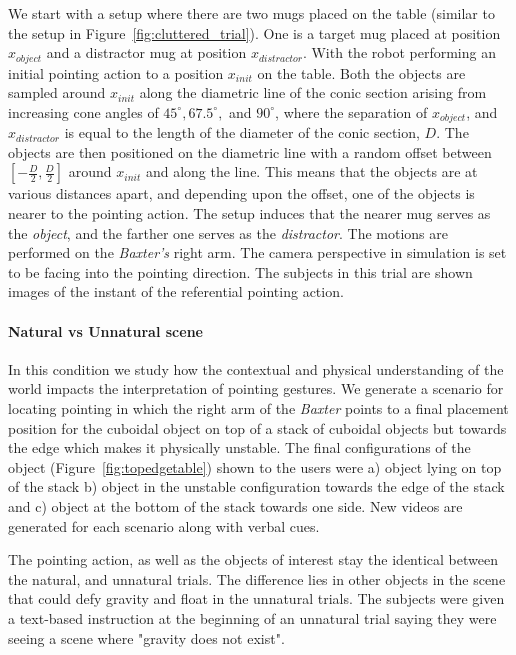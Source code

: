 We start with a setup where there are two mugs placed on the table (similar to the setup in Figure~\ref{fig:cluttered_trial}). One is a target mug placed at position $x_{object}$ and a distractor mug at position $x_{distractor}$. With the robot performing an initial pointing action to a position $x_{init}$ on the table. Both the objects are sampled around $x_{init}$ along the diametric line of the conic section arising from increasing cone angles of $45^\circ, 67.5^\circ, $ and $90^\circ$, where the separation of $x_{object}$, and $x_{distractor}$ is equal to the length of the diameter of the conic section, $D$. The objects are then positioned on the diametric line with a random offset between $[-\frac{D}{2}, \frac{D}{2}]$ around $x_{init}$ and along the line. This means that the objects are at various distances apart, and depending upon the offset, one of the objects is nearer to the pointing action. The setup induces that the nearer mug serves as the \textit{object}, and the farther one serves as the \textit{distractor}. The motions are performed on the \textit{Baxter's} right arm. The camera perspective in simulation is set to be facing into the pointing direction. The subjects in this trial are shown images of the instant of the referential pointing action.


\paragraph{Natural vs Unnatural scene}
In this condition we study how the contextual and physical understanding of the world impacts the interpretation of pointing gestures. We generate a scenario for locating pointing in which the right arm of the \textit{Baxter} points to a final placement position for the cuboidal object on top of a stack of cuboidal objects but towards the edge which makes it physically unstable. The final configurations of the object (Figure~\ref{fig:topedgetable}) shown to the users were a) object lying on top of the stack b) object in the unstable configuration towards the edge of the stack and c) object at the bottom of the stack towards one side. New videos are generated for each scenario along with verbal cues.

The pointing action, as well as the objects of interest stay the identical between the natural, and unnatural trials. The difference lies in other objects in the scene that could defy gravity and float in the unnatural trials. The subjects were given a text-based instruction at the beginning of an unnatural trial saying they were seeing a scene where "gravity does not exist". 

